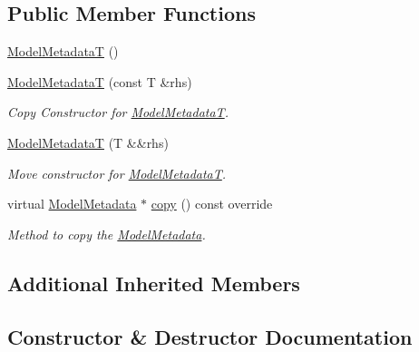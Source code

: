 \subsection*{Public Member Functions}
\begin{DoxyCompactItemize}
\item 
\hyperlink{classdg_1_1deepcore_1_1classification_1_1_model_metadata_t_a4086302e7b564f3e5a2b7ed526375c6e}{Model\+MetadataT} ()
\item 
\hyperlink{group___classification_module_ga52e88b4c63c2a8db9b06ce5b470be1c4}{Model\+MetadataT} (const T \&rhs)
\begin{DoxyCompactList}\small\item\em Copy Constructor for \hyperlink{classdg_1_1deepcore_1_1classification_1_1_model_metadata_t}{Model\+MetadataT}. \end{DoxyCompactList}\item 
\hyperlink{group___classification_module_ga76d79f72f6223539cf9d8b9549cc8a2d}{Model\+MetadataT} (T \&\&rhs)
\begin{DoxyCompactList}\small\item\em Move constructor for \hyperlink{classdg_1_1deepcore_1_1classification_1_1_model_metadata_t}{Model\+MetadataT}. \end{DoxyCompactList}\item 
virtual \hyperlink{classdg_1_1deepcore_1_1classification_1_1_model_metadata}{Model\+Metadata} $\ast$ \hyperlink{group___classification_module_ga4f92b6936e50c4e47ca4ceaaac0466f5}{copy} () const override
\begin{DoxyCompactList}\small\item\em Method to copy the \hyperlink{classdg_1_1deepcore_1_1classification_1_1_model_metadata}{Model\+Metadata}. \end{DoxyCompactList}\end{DoxyCompactItemize}
\subsection*{Additional Inherited Members}


\subsection{Constructor \& Destructor Documentation}
